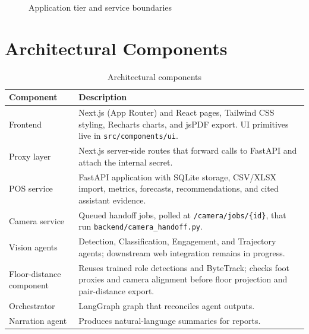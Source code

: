 \begin{figure}[H]
\centering
{}
\caption{Application tier and service boundaries}
\label{fig:tiers}
\end{figure}

\section{Architectural Components}
\begin{table}[H]
\centering
\caption{Architectural components}
\begin{tabular}{P{0.26\textwidth}P{0.62\textwidth}}
\toprule
Component & Description\\
\midrule
Frontend & Next.js (App Router) and React pages, Tailwind CSS styling, Recharts charts, and jsPDF export. UI primitives live in \texttt{src/components/ui}.\\
Proxy layer & Next.js server-side routes that forward calls to FastAPI and attach the internal secret.\\
POS service & FastAPI application with SQLite storage, CSV/XLSX import, metrics, forecasts, recommendations, and cited assistant evidence.\\
Camera service & Queued handoff jobs, polled at \texttt{/camera/jobs/\{id\}}, that run \texttt{backend/camera\_handoff.py}.\\
Vision agents & Detection, Classification, Engagement, and Trajectory agents; downstream web integration remains in progress.\\
Floor-distance component & Reuses trained role detections and ByteTrack; checks foot proxies and camera alignment before floor projection and pair-distance export.\\
Orchestrator & LangGraph graph that reconciles agent outputs.\\
Narration agent & Produces natural-language summaries for reports.\\
\bottomrule
\end{tabular}
\end{table}

